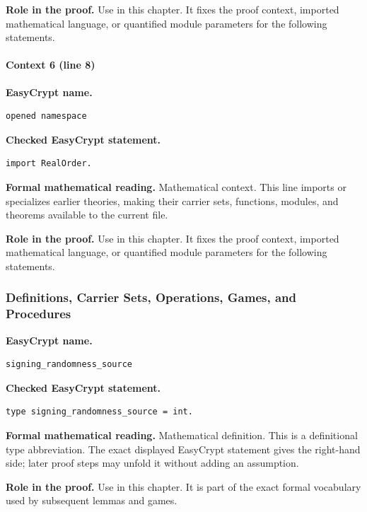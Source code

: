 \noindent\textbf{Role in the proof.}
Use in this chapter. It fixes the proof context, imported mathematical language, or quantified module parameters for the following statements.

\paragraph{Context 6 (line 8)}
\noindent\textbf{EasyCrypt name.}
\begin{lstlisting}[language=EasyCrypt,basicstyle=\ttfamily\scriptsize]
opened namespace
\end{lstlisting}
\noindent\textbf{Checked EasyCrypt statement.}
\begin{lstlisting}[language=EasyCrypt,basicstyle=\ttfamily\scriptsize]
import RealOrder.
\end{lstlisting}
\noindent\textbf{Formal mathematical reading.}
Mathematical context. This line imports or specializes earlier theories, making their carrier sets, functions, modules, and theorems available to the current file.

\noindent\textbf{Role in the proof.}
Use in this chapter. It fixes the proof context, imported mathematical language, or quantified module parameters for the following statements.

\subsubsection*{Definitions, Carrier Sets, Operations, Games, and Procedures}
\begin{formaldefinition}
\noindent\textbf{EasyCrypt name.}
\begin{lstlisting}[language=EasyCrypt,basicstyle=\ttfamily\scriptsize]
signing_randomness_source
\end{lstlisting}
\noindent\textbf{Checked EasyCrypt statement.}
\begin{lstlisting}[language=EasyCrypt,basicstyle=\ttfamily\scriptsize]
type signing_randomness_source = int.
\end{lstlisting}
\noindent\textbf{Formal mathematical reading.}
Mathematical definition. This is a definitional type abbreviation.  The exact displayed EasyCrypt statement gives the right-hand side; later proof steps may unfold it without adding an assumption.

\noindent\textbf{Role in the proof.}
Use in this chapter. It is part of the exact formal vocabulary used by subsequent lemmas and games.

\end{formaldefinition}

